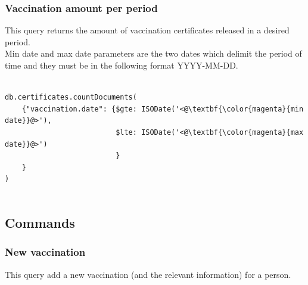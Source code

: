 \documentclass{article}
\begin{document}
\subsubsection{Vaccination amount per period}
This query returns the amount of vaccination certificates released in a desired period.\\
Min date and max date parameters are the two dates which delimit the period of time and they must be in the following format YYYY-MM-DD.

\begin{lstlisting}[language=cypher, label=lst:cypher-example]

db.certificates.countDocuments(
    {"vaccination.date": {$gte: ISODate('<@\textbf{\color{magenta}{min date}}@>'),
                          $lte: ISODate('<@\textbf{\color{magenta}{max date}}@>')
                          }
    }
)


\end{lstlisting}
\newpage
\subsection{Commands}
\subsubsection{New vaccination}
This query add a new vaccination (and the relevant information) for a person.
\end{document}
